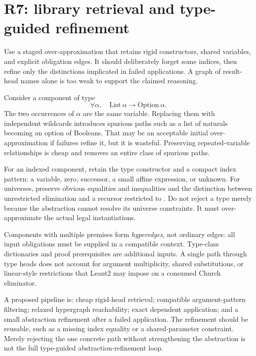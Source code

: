 \section{R7: library retrieval and type-guided refinement}
\label{sec:retrieval}

\ans Use a staged over-approximation that retains rigid constructors, shared variables, and explicit obligation edges. It should deliberately forget some indices, then refine only the distinctions implicated in failed applications. A graph of result-head names alone is too weak to support the claimed reasoning.

Consider a component of type
\[
 \forall \alpha,\quad \mathrm{List}\ \alpha\to\mathrm{Option}\ \alpha.
\]
The two occurrences of $\alpha$ are the same variable. Replacing them with independent wildcards introduces spurious paths such as a list of naturals becoming an option of Booleans. That may be an acceptable initial over-approximation if failures refine it, but it is wasteful. Preserving repeated-variable relationships is cheap and removes an entire class of spurious paths.

For an indexed component, retain the type constructor and a compact index pattern: a variable, zero, successor, a small affine expression, or unknown. For universes, preserve obvious equalities and inequalities and the distinction between unrestricted elimination and a recursor restricted to . Do not reject a type merely because the abstraction cannot resolve its universe constraints. It must over-approximate the actual legal instantiations.

Components with multiple premises form \emph{hyperedges}, not ordinary edges: all input obligations must be supplied in a compatible context. Type-class dictionaries and proof prerequisites are additional inputs. A single path through type heads does not account for argument multiplicity, shared substitutions, or linear-style restrictions that Leant2 may impose on a consumed Church eliminator.

A proposed pipeline is: cheap rigid-head retrieval; compatible argument-pattern filtering; relaxed hypergraph reachability; exact dependent application; and a small abstraction refinement after a failed application. The refinement should be reusable, such as a missing index equality or a shared-parameter constraint. Merely rejecting the one concrete path without strengthening the abstraction is not the full type-guided abstraction-refinement loop.

